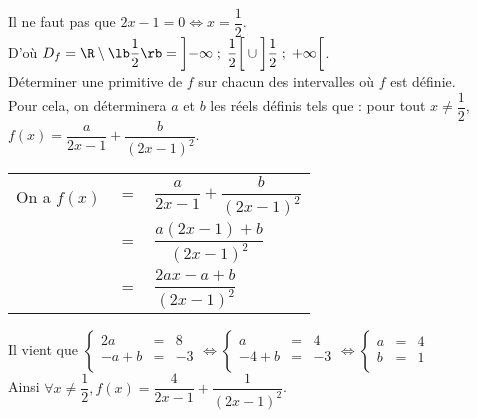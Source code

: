 Il ne faut pas que $2x -1 = 0 \Longleftrightarrow x = \dfrac{1}{2}$. \\

D'où $D_f = \R \setminus \lb \dfrac{1}{2} \rb = \left]-\infty \; ; \; \dfrac{1}{2} \right[ \cup \left] \dfrac{1}{2} \; ; \; +\infty \right[$. \\

Déterminer une primitive de $f$ sur chacun des intervalles où $f$ est définie. \\

Pour cela, on déterminera $a$ et $b$ les réels définis tels que : pour tout $x \neq \dfrac{1}{2}$, $f(x) = \dfrac{a}{2x - 1} + \dfrac{b}{\left(2x-1\right)^2}$. \vspace*{.3cm} \\

\begin{tabular}{lll}
\hspace*{-.3cm} On a $f(x)$ & $ = $ & $\dfrac{a}{2x - 1} + \dfrac{b}{\left(2x-1\right)^2}$ \vspace*{.3cm} \\
& $=$ & $\dfrac{a\left(2x-1\right) + b}{\left(2x-1\right)^2}$ \vspace*{.3cm} \\
& $=$ & $\dfrac{2ax - a + b}{\left(2x-1\right)^2}$ \\
\end{tabular}

\vspace*{.3cm}

Il vient que $\left\{
  \begin{array}{rll}
    2a & = & 8 \\
    -a + b & = & -3 \\
  \end{array}
\right. \Longleftrightarrow \left\{
  \begin{array}{rll}
    a & = & 4 \\
    -4 + b & = & -3 \\
  \end{array}
\right. \Longleftrightarrow \left\{
  \begin{array}{rll}
    a & = & 4 \\
    b & = & 1 \\
  \end{array}
\right.$ \vspace*{.3cm} \\

Ainsi $\forall x \neq \dfrac{1}{2}, f(x) = \dfrac{4}{2x-1} + \dfrac{1}{\left(2x-1\right)^2}$. \vspace*{.3cm} \\

